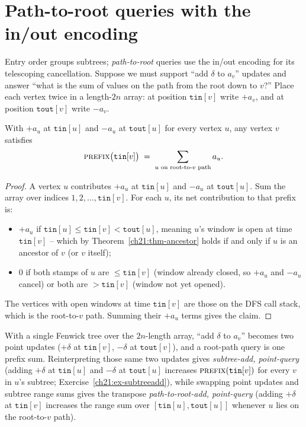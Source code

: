 \section{Path-to-root queries with the in/out encoding}
\label{ch21:path}

Entry order groups subtrees; \emph{path-to-root} queries use the in/out
encoding for its telescoping cancellation. Suppose we must support
``add $\delta$ to $a_v$'' updates and answer ``what is the sum of values on the path
from the root down to $v$?'' Place each vertex twice in a length-$2n$ array: at
position $\texttt{tin}[v]$ write $+a_v$, and at position $\texttt{tout}[v]$ write
$-a_v$.

\begin{theorem}
\label{ch21:thm-pathsum}
With $+a_u$ at $\texttt{tin}[u]$ and $-a_u$ at $\texttt{tout}[u]$ for every vertex $u$, any vertex $v$ satisfies
\[
\textsc{prefix}\bigl(\texttt{tin}[v]\bigr)\;=\;\sum_{u\textnormal{ on root-to-}v\textnormal{ path}} a_u .
\]
\end{theorem}

\begin{proof}
A vertex $u$ contributes $+a_u$ at $\texttt{tin}[u]$ and $-a_u$ at $\texttt{tout}[u]$.
Sum the array over indices $1, 2, \dots, \texttt{tin}[v]$. For each $u$, its net contribution
to that prefix is:
\begin{itemize}
\item $+a_u$ if $\texttt{tin}[u]\le\texttt{tin}[v]<\texttt{tout}[u]$, meaning $u$'s
window is open at time $\texttt{tin}[v]$ -- which by
Theorem~\ref{ch21:thm-ancestor} holds if and only if $u$ is an ancestor of $v$ (or $v$
itself);
\item $0$ if both stamps of $u$ are $\le\texttt{tin}[v]$ (window already closed, so $+a_u$ and $-a_u$ cancel) or
both are $>\texttt{tin}[v]$ (window not yet opened).
\end{itemize}
The vertices with open windows at time $\texttt{tin}[v]$ are those on the
DFS call stack, which is the root-to-$v$ path. Summing their $+a_u$ terms gives the claim.
\end{proof}

With a single Fenwick tree over the $2n$-length array, ``add $\delta$ to $a_v$''
becomes two point updates ($+\delta$ at $\texttt{tin}[v]$, $-\delta$ at
$\texttt{tout}[v]$), and a root-path query is one prefix sum. Reinterpreting those same two updates gives \emph{subtree-add, point-query} (adding $+\delta$ at $\texttt{tin}[u]$ and $-\delta$ at $\texttt{tout}[u]$ increases $\textsc{prefix}(\texttt{tin}[v])$ for every $v$ in $u$'s subtree; Exercise~\ref{ch21:ex-subtreeadd}), while swapping point updates and subtree range sums gives the transpose \emph{path-to-root-add, point-query} (adding $+\delta$ at $\texttt{tin}[v]$ increases the range sum over $[\texttt{tin}[u],\texttt{tout}[u]]$ whenever $u$ lies on the root-to-$v$ path).

